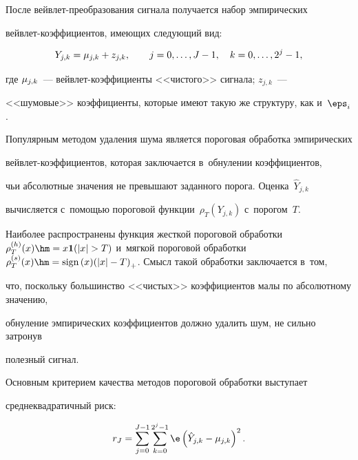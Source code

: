 После вейвлет-преобразования сигнала получается набор эмпирических 

вейв\-лет-ко\-эф\-фи\-ци\-ен\-тов, имеющих следующий вид:

\begin{equation*}


Y_{j,k}=\mujk+z_{j,k}, \qquad j=0,\ldots,J-1,\quad k=0,\ldots,2^j-1,

\end{equation*}

где $\mu_{j,k}$~--- вейвлет-коэффициенты <<чистого>> сигнала;  $z_{j,k}$~--- 

<<шумовые>> коэффициенты, которые имеют такую же структуру, как и~$\eps_i$.



Популярным методом удаления шума является пороговая обработка эмпирических 

вейв\-лет-ко\-эф\-фи\-ци\-ен\-тов, которая заключается в~обнулении коэффициентов, 

чьи абсолютные значения не превышают заданного порога. Оценка~$\hat{Y}_{j,k}$ 

вычисляется с~помощью пороговой функции~$\rho_T(Y_{j,k})$ с~порогом~$T$. 

Наиболее распространены функция жесткой пороговой обработки $\rho_T^{(h)}(x)

\hm=x \mathbf{1} (|x|>T)$ и~мягкой пороговой обработки $\rho_T^{(s)}(x)

\hm={\mathrm{sign}}\left(x)(|x|-T\right)_+$. Смысл такой обработки заключается в~том,

 что, поскольку большинство <<чистых>> коэффициентов малы по абсолютному значению, 

 обнуление эмпирических коэффициентов должно удалить шум, не сильно затронув 

 полезный сигнал.



Основным критерием качества методов пороговой обработки выступает 

среднеквадратичный риск:

\begin{equation}

\label{Risk_Definition}

r_J=\sum\limits_{j=0}^{J-1}\sum\limits_{k=0}^{2^j-1} \e

\left(\hat{Y}_{j,k}-\mujk\right)^2.

\end{equation}



